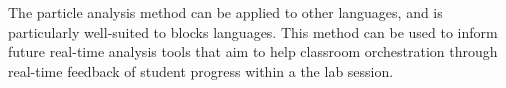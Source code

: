 The particle analysis method can be applied to other languages, and is particularly well-suited to blocks languages. This method can be used to inform future real-time analysis tools that aim to help classroom orchestration through real-time feedback of student progress within a the lab session.

